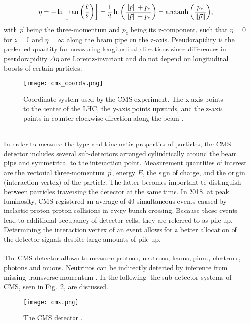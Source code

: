 \documentclass[../../main.tex]{subfiles}
\begin{document}
\begin{equation}
	\eta = -\ln\bigg[\tan\bigg(\frac{\theta}{2}\bigg)\bigg] = \frac{1}{2}\ln\bigg(\frac{\left\Vert \vec{p} \right\Vert+p_z}{\left\Vert \vec{p} \right\Vert-p_z}\bigg) = \operatorname{arctanh}\bigg(\frac{p_z}{\left\Vert \vec{p} \right\Vert}\bigg),
\end{equation}
with $\vec{p}$ being the three-momentum and $p_z$ being its z-component, such that $\eta=0$ for $z=0$ and $\eta=\infty$ along the beam pipe on the z-axis. Pseudorapidity is the preferred quantity for measuring longitudinal directions since differences in pseudorapidity $\Delta\eta$ are Lorentz-invariant and do not depend on longitudinal boosts of certain particles.\\
\begin{figure}[htp]
	\begin{center}
		\texttt{[image: cms\_coords.png]}
		\caption{Coordinate system used by the CMS experiment. The x-axis points to the center of the LHC, the y-axis points upwards, and the z-axis points in counter-clockwise direction along the beam \cite{mr}.}
		\label{fig:cms_coord}
	\end{center}
\end{figure}
\\
In order to measure the type and kinematic properties of particles, the CMS detector includes several sub-detectors arranged cylindrically around the beam pipe and symmetrical to the interaction point. Measurement quantities of interest are the vectorial three-momentum $\vec{p}$, energy $E$, the sign of charge, and the origin (interaction vertex) of the particle. The latter becomes important to distinguish between particles traversing the detector at the same time. In 2018, at peak luminosity, CMS registered an average of 40 simultaneous events caused by inelastic proton-proton collisions in every bunch crossing. Because these events lead to additional occupancy of detector cells, they are referred to as pile-up. Determining the interaction vertex of an event allows for a better allocation of the detector signals despite large amounts of pile-up.\\
\\
The CMS detector allows to measure protons, neutrons, kaons, pions, electrons, photons and muons. Neutrinos can be indirectly detected by inference from missing transverse momentum \cite{awr}. In the following, the sub-detector systems of CMS, seen in Fig.~\ref{fig:cms}, are discussed.

\begin{figure}[H]
	\begin{center}
		\texttt{[image: cms.png]}
		\caption{The CMS detector \cite{cms_overview}.}
		\label{fig:cms}
	\end{center}
\end{figure}
\end{document}
